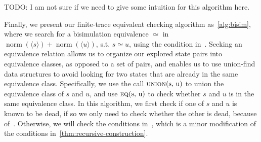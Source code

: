 \documentclass[conference]{IEEEtran}
\newcommand{\At}{\mathbf{At}}
\newcommand{\reject}{\mathinner{\mathrm{rej}}}
\newcommand{\accept}{\mathinner{\mathrm{acc}}}
\DeclareMathOperator{\norm}{\mathrm{norm}}
\begin{document}
TODO: I am not sure if we need to give some intuition for this algorithm here.

Finally, we present our finite-trace equivalent checking algorithm as~\cref{alg:bisim}, where we search for a bisimulation equivalence \({≃}\) in \(\norm(⟨s⟩) + \norm(⟨u⟩)\), s.t. \(s ≃ u\), using the condition in~.
Seeking an equivalence relation allows us to organize our explored state pairs into equivalence classes, as opposed to a set of pairs, and enables us to use union-find data structures to avoid looking for two states that are already in the same equivalence class.
Specifically, we use the call \(\Call{union}{$s, u$}\) to union the equivalence class of \(s\) and \(u\), and use \(\Call{eq}{$s, u$}\) to check whether \(s\) and \(u\) is in the same equivalence class. 
In this algorithm, we first check if one of \(s\) and \(u\) is known to be dead, if so we only need to check whether the other is dead, because of~.
Otherwise, we will check the conditions in~, which is a minor modification of the conditions in~\cref{thm:recursive-construction}.




\end{document}

